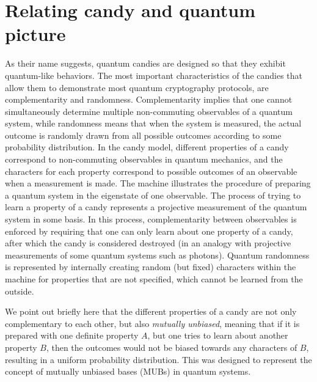 \documentclass{article}
\begin{document}
\section{Relating candy and quantum picture}
As their name suggests, quantum candies are designed so that they exhibit quantum-like behaviors.
The most important characteristics of the candies that allow them to demonstrate most quantum cryptography protocols, are complementarity and randomness.
Complementarity implies that one cannot simultaneously determine multiple non-commuting observables of a quantum system, while randomness means that when the system is measured, the actual outcome is randomly drawn from all possible outcomes according to some probability distribution.
In the candy model, different properties of a candy correspond to non-commuting observables in quantum mechanics, and the characters for each property correspond to possible outcomes of an observable when a measurement is made.
The machine illustrates the procedure of preparing a quantum system in the eigenstate of one observable.
The process of trying to learn a property of a candy represents a projective measurement of the quantum system in some basis.
In this process, complementarity between observables is enforced by requiring that one can only learn about one property of a candy, after which the candy is considered destroyed (in an analogy with projective measurements of some quantum systems such as photons).
Quantum randomness is represented by internally creating random (but fixed) characters within the machine for properties that are not specified, which cannot be learned from the outside.


We point out briefly here that the different properties of a candy are not only complementary to each other, but also \textit{mutually unbiased}, meaning that if it is prepared with one definite property $A$, but one tries to learn about another property $B$, then the outcomes would not be biased towards any characters of $B$, resulting in a uniform probability distribution.
This was designed to represent the concept of mutually unbiased bases (MUBs) in quantum systems.
\end{document}
